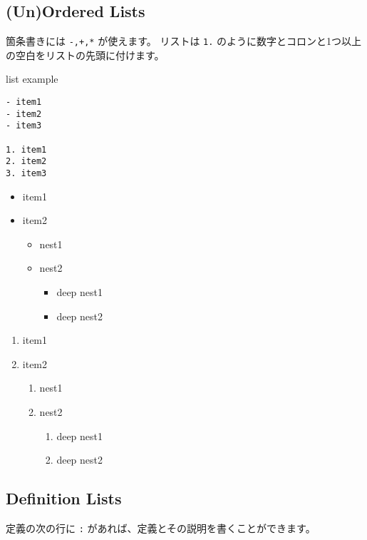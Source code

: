 \documentclass[a4j]{jarticle}
\begin{document}
\subsection{(Un)Ordered Lists}

箇条書きには {\tt -,+,*} が使えます。
リストは {\tt 1.} のように数字とコロンと1つ以上の空白をリストの先頭に付けます。

\begin{itembox}[c]{list example}
\begin{verbatim}
- item1
- item2
- item3

1. item1
2. item2
3. item3
\end{verbatim}
\end{itembox}

\begin{itemize}
\item item1
\item item2


\begin{itemize}
\item nest1
\item nest2


\begin{itemize}
\item deep nest1
\item deep nest2
\end{itemize}
\end{itemize}
\end{itemize}

\begin{enumerate}
\item item1
\item item2


\begin{enumerate}
\item nest1
\item nest2


\begin{enumerate}
\item deep nest1
\item deep nest2
\end{enumerate}
\end{enumerate}
\end{enumerate}

\fi
\subsection{Definition Lists}

定義の次の行に {\tt :} があれば、定義とその説明を書くことができます。
\end{document}
